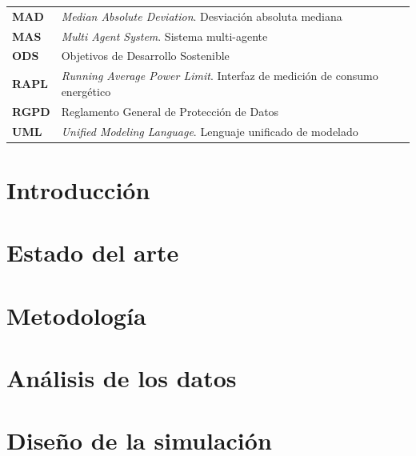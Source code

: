 \documentclass[12pt]{report} %
\begin{document}
\begin{longtable}{@{}p{2.5cm}p{\dimexpr\textwidth-3cm\relax}@{}}
\textbf{MAD}   & \textit{Median Absolute Deviation}. Desviación absoluta mediana \\
\textbf{MAS}   & \textit{Multi Agent System}. Sistema multi-agente \\
\textbf{ODS}   & Objetivos de Desarrollo Sostenible \\
\textbf{RAPL}  & \textit{Running Average Power Limit}. Interfaz de medición de consumo energético \\
\textbf{RGPD}  & Reglamento General de Protección de Datos \\
\textbf{UML}   & \textit{Unified Modeling Language}. Lenguaje unificado de modelado \\
\end{longtable}

\newpage
\thispagestyle{empty}
\mbox{}


\clearpage
{} %

\chapter{Introducción}



\chapter{Estado del arte}
\label{chapter:state_of_art}




\chapter{Metodología}


\chapter{Análisis de los datos}\label{chapter:param_analisys}



\chapter{Diseño de la simulación}\label{chapter:simulation_design}

\end{document}
